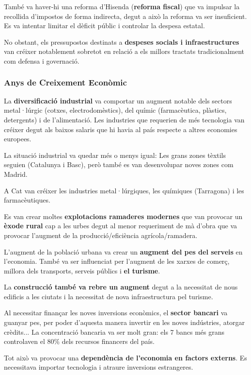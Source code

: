 \documentclass[arial,a4paper,print]{article}
\begin{document}
També va haver-hi una reforma d'Hisenda (\textbf{reforma fiscal}) que va impulsar la recollida d'impostos de forma indirecta, degut a això la reforma va ser insuficient. Es va intentar limitar el dèficit públic i controlar la despesa estatal.  

No obstant, els pressupostos destinats a \textbf{despeses socials i infraestructures} van créixer notablement sobretot en relació a els millors tractats tradicionalment com defensa i governació. 

\subsubsection{Anys de Creixement Econòmic}
La \textbf{diversificació industrial} va comportar un augment notable dels sectors metal·lúrgic (cotxes, electrodomèstics), del químic (farmacèutica, plàstics, detergents) i de l'alimentació. Les industries que requerien de més tecnologia van créixer degut als baixos salaris que hi havia al país respecte a altres economies europees. 

La situació industrial va quedar més o menys igual: Les grans zones tèxtils seguien (Catalunya i Basc), però també es van desenvolupar noves zones com Madrid. 

A Cat van créixer les industries metal·lúrgiques, les químiques (Tarragona) i les farmacèutiques. 

Es van crear moltes \textbf{explotacions ramaderes modernes} que van provocar un \textbf{èxode rural} cap a les urbes degut al menor requeriment de mà d'obra que va provocar l'augment de la producció/eficiència agrícola/ramadera. 

L'augment de la població urbana va crear un \textbf{augment del pes del serveis} en l'economia. També va ser influenciat per l'augment de les xarxes de comerç, millora dels transports, serveis públics i \textbf{el turisme}. 

La \textbf{construcció també va rebre un augment} degut a la necessitat de nous edificis a les ciutats i la necessitat de nova infraestructura pel turisme. 

Al necessitar finançar les noves inversions econòmics, el \textbf{sector bancari} va guanyar pes, per poder d'aquesta manera invertir en les noves indústries, atorgar crèdits... La concentració bancaria va ser molt gran: els 7 bancs més grans controlaven el 80\% dels recursos financers del país. 

Tot això va provocar una \textbf{dependència de l'economia en factors externs}. Es necessitava importar tecnologia i atraure inversions estrangeres. 
\end{document}
